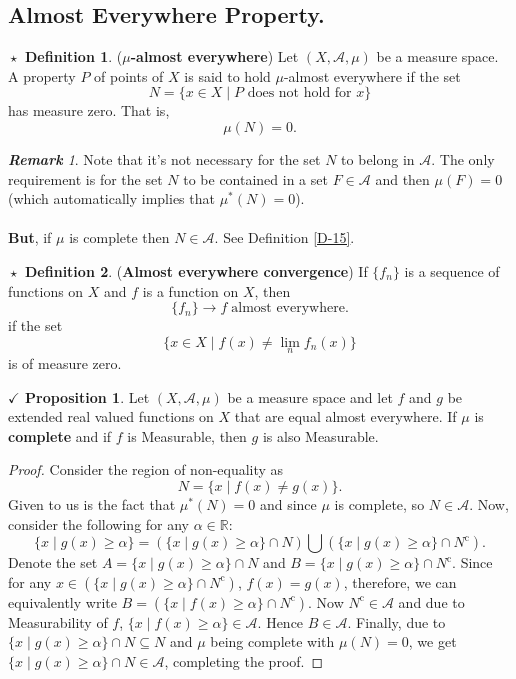 \documentclass{article}
\theoremstyle{definition}
\newtheorem{definition}{$\boxed{\star}$ Definition}
\theoremstyle{remark}
\newtheorem*{remark}{\textbf{Remark}}
\theoremstyle{definition}
\theoremstyle{definition}
\newtheorem{proposition}{$\checkmark$ Proposition}
\theoremstyle{definition}
\newcommand{\intrs}{\cap}
\newcommand{\bunion}{\bigcup}
\newcommand{\where}{\;\vert\;}
\newcommand{\R}{\mathbb{R}}
\newcommand{\alg}[1]{\mathscr{#1}}
\newcommand{\comp}[1]{#1^{\text{c}}}
\newcommand{\m}[1]{\mu\left (#1\right )}
\newcommand{\om}[1]{\mu^*\left ( #1\right )}
\begin{document}
\subsection{Almost Everywhere Property.}
\begin{definition}
	(\textbf{$ \mu $-almost everywhere}) Let $ (X,\alg{A},\mu) $ be a measure space. A property $ P $ of points of $ X $ is said to hold $ \mu $-almost everywhere if the set
	\[N = \{x\in X\where P \text{ does not hold for }x \}\]
	has measure zero. That is,
	\[\m{N} = 0.\]
	
\end{definition}
\begin{remark}
	Note that it's not necessary for the set $ N $ to belong in $ \alg{A} $. The only requirement is for the set $ N $ to be contained in a set $ F \in \alg{A} $ and then $ \m{F} = 0 $ (which automatically implies that $ \om{N} = 0 $).\\\\
	\textbf{But}, if $ \mu $ is complete then $ N \in \alg{A} $. See Definition \ref{D-15}.
\end{remark}
\hrulefill
\begin{definition}
	(\textbf{Almost everywhere convergence}) If $ \{f_n\} $ is a sequence of functions on $ X $ and $ f $ is a function on $ X $, then
	\[\{f_n\}\longrightarrow f\;\text{almost everywhere.}\]
	if the set
	\[\{x\in X\where f(x)\neq \lim_nf_n(x)\}\]
  is of measure zero.
\end{definition}
\hrulefill
\begin{proposition}\label{P-21}
	Let $ (X,\alg{A},\mu) $ be a measure space and let $ f $ and $ g $ be extended real valued functions on $ X $ that are equal almost everywhere. If $ \mu $ is \textbf{complete} and if $ f $ is Measurable, then $ g $ is also Measurable.
\end{proposition}
\begin{proof}
Consider the region of non-equality as
\[N = \{x\where f(x)\neq g(x)\}.\]
Given to us is the fact that $ \om{N} = 0 $ and since $ \mu $ is complete, so $ N\in \alg{A} $. Now, consider the following for any $ \alpha\in \R $:
\[\{x\where g(x)\ge \alpha\} = \left (\{x\where g(x)\ge \alpha\} \intrs N\right ) \bunion \left (\{x\where g(x)\ge \alpha\}\intrs \comp{N}\right ).\]
Denote the set $ A = \{x\where g(x)\ge \alpha\} \intrs N $ and $B =\{x\where g(x)\ge \alpha\}\intrs \comp{N}$. Since for any $ x\in\left (\{x\where g(x)\ge \alpha\}\intrs \comp{N}\right ) $, $ f(x) = g(x) $, therefore, we can equivalently write $ B = \left (\{x\where f(x)\ge \alpha\}\intrs \comp{N}\right ) $. Now $ \comp{N} \in \alg{A}$ and due to Measurability of $ f $, $ \{x\where f(x)\ge \alpha\}\in \alg{A} $. Hence $ B\in \alg{A} $. Finally, due to $ \{x\where g(x)\ge \alpha\} \intrs N \subseteq N $ and $ \mu $ being complete with $ \m{N} = 0 $, we get $ \{x\where g(x)\ge \alpha\} \intrs N \in \alg{A} $, completing the proof. 
\end{proof}
\end{document}

